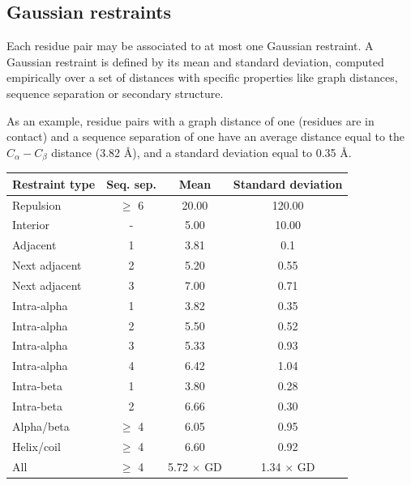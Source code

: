   \subsection{Gaussian restraints}

    Each residue pair may be associated to at most one Gaussian restraint.
    A Gaussian restraint is defined by its mean and standard deviation,
    computed empirically over a set of distances with specific properties
    like graph distances, sequence separation or secondary structure.

    As an example, residue pairs with a graph distance of one (residues are
    in contact) and a sequence separation of one have an average distance equal
    to the $C_{\alpha}-C_{\beta}$ distance (3.82 \AA{}), and a standard deviation
    equal to 0.35 \AA{}.

    \begin{table}[H]
        \centering
        \begin{tabular}{|l|c|c|c|}
            \hline
            Restraint type & Seq. sep. & Mean & Standard deviation \\
            \hline
            \hline
            Repulsion     & $\ge$ 6 & 20.00 & 120.00 \\
            Interior      & - & 5.00 & 10.00 \\
            Adjacent      & 1 & 3.81 & 0.1  \\
            Next adjacent & 2 & 5.20 & 0.55 \\
            Next adjacent & 3 & 7.00 & 0.71 \\
            Intra-alpha   & 1 & 3.82 & 0.35 \\
            Intra-alpha   & 2 & 5.50 & 0.52 \\
            Intra-alpha   & 3 & 5.33 & 0.93 \\
            Intra-alpha   & 4 & 6.42 & 1.04 \\
            Intra-beta    & 1 & 3.80 & 0.28 \\
            Intra-beta    & 2 & 6.66 & 0.30 \\
            Alpha/beta    & $\ge$ 4 & 6.05 & 0.95 \\
            Helix/coil    & $\ge$ 4 & 6.60 & 0.92 \\
            All & $\ge$ 4 & 5.72 $\times$ GD & 1.34 $\times$ GD \\
            \hline
        \end{tabular}
        \label{restraints}
    \end{table}

